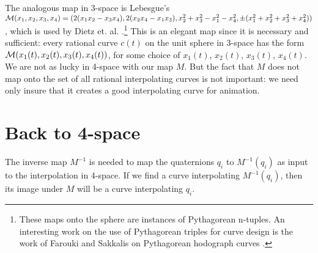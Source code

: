 The analogous map in 3-space is Lebesgue's
$ {\cal M}(x_1,x_2,x_3,x_4) = 
(2(x_1x_2-x_3x_4),2(x_2x_4-x_1x_3),
x_2^2 + x_3^2 - x_1^2 - x_4^2,\pm(x_1^2 + x_2^2 + x_3^2 + x_4^2))$
\cite{dickson52,dietz93}, which is used by Dietz et. al. 
\cite{dietz93}.\footnote{These maps onto the sphere are 
	instances of Pythagorean n-tuples.  An interesting work
	on the use of Pythagorean triples for curve design
	is the work of Farouki and Sakkalis on Pythagorean hodograph curves
	\cite{farouki90}.}
This is an elegant map since it is necessary and sufficient: 
every rational curve $c(t)$
on the unit sphere in 3-space has the form
${\cal M}(x_1(t),x_2(t),x_3(t),x_4(t))$,
for some choice of $x_1(t)$, $x_2(t)$, $x_3(t)$, $x_4(t)$.
We are not as lucky in 4-space with our map $M$.
But the fact that $M$ does not map onto the set of all rational 
interpolating curves is not important: we need only insure that it
creates a good interpolating curve for animation.


\section{Back to 4-space}
\label{sec:invM}

The inverse map $M^{-1}$ is needed
to map the quaternions $q_i$ to $M^{-1}(q_i)$ as input to the
interpolation in 4-space.
If we find a curve interpolating $M^{-1}(q_i)$,
then its image under $M$ will be a curve interpolating $q_i$.

